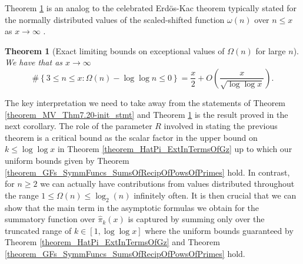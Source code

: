 \documentclass[11pt,reqno,a4letter]{article}
\numberwithin{figure}{section}
\numberwithin{table}{section}
\newcommand{\cf}{\textit{cf.\ }}
\theoremstyle{plain}
\newtheorem{theorem}{Theorem}
\numberwithin{theorem}{section}
\theoremstyle{definition}
\begin{document}
Theorem \ref{theorem_MV_Thm7.21-init_stmt} is an analog to the 
celebrated Erd\"os-Kac theorem typically stated for the 
normally distributed values of the scaled-shifted function $\omega(n)$ over $n \leq x$ as 
$x \rightarrow \infty$ \cite[\cf Thm.\ 7.21]{MV}. 

\begin{theorem}[Exact limiting bounds on exceptional values of $\Omega(n)$ for large $n$] 
\label{theorem_MV_Thm7.21-init_stmt} 
We have that as $x \rightarrow \infty$ 
\[
\#\left\{3 \leq n \leq x: \Omega(n) - \log\log n \leq 0\right\} = 
     \frac{x}{2} + O\left(\frac{x}{\sqrt{\log\log x}}\right). 
\]
\end{theorem} 

The key interpretation we need to take away from the statements 
of Theorem \ref{theorem_MV_Thm7.20-init_stmt} and 
Theorem \ref{theorem_MV_Thm7.21-init_stmt} 
is the result proved in the next corollary. 
The role of the parameter $R$ involved in stating the previous theorem 
is a critical bound as the scalar factor in the upper bound on $k \leq \log\log x$ in 
Theorem \ref{theorem_HatPi_ExtInTermsOfGz} up to which our uniform bounds given by 
Theorem \ref{theorem_GFs_SymmFuncs_SumsOfRecipOfPowsOfPrimes} hold. 
In contrast, for $n \geq 2$ we can actually 
have contributions from values distributed throughout the range $1 \leq \Omega(n) \leq \log_2(n)$ 
infinitely often. 
It is then crucial that we can show that the main term in the asymptotic formulas we obtain 
for the summatory function over $\widehat{\pi}_k(x)$ 
is captured by summing only over the truncated range of 
$k \in [1, \log\log x]$ where the uniform bounds 
guaranteed by Theorem \ref{theorem_HatPi_ExtInTermsOfGz} and 
Theorem \ref{theorem_GFs_SymmFuncs_SumsOfRecipOfPowsOfPrimes} hold. 
\end{document}

